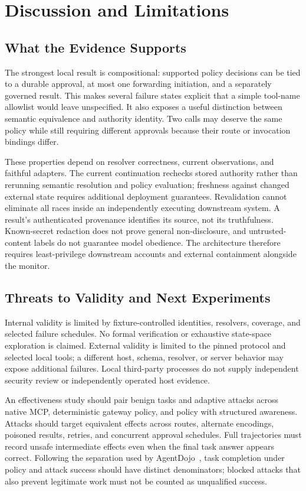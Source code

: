 \documentclass[conference,letterpaper]{IEEEtran}
\begin{document}
\section{Discussion and Limitations}
\subsection{What the Evidence Supports}
The strongest local result is compositional: supported policy decisions can be tied to a durable approval, at most one forwarding initiation, and a separately governed result. This makes several failure states explicit that a simple tool-name allowlist would leave unspecified. It also exposes a useful distinction between semantic equivalence and authority identity. Two calls may deserve the same policy while still requiring different approvals because their route or invocation bindings differ.

These properties depend on resolver correctness, current observations, and faithful adapters. The current continuation rechecks stored authority rather than rerunning semantic resolution and policy evaluation; freshness against changed external state requires additional deployment guarantees. Revalidation cannot eliminate all races inside an independently executing downstream system. A result's authenticated provenance identifies its source, not its truthfulness. Known-secret redaction does not prove general non-disclosure, and untrusted-content labels do not guarantee model obedience. The architecture therefore requires least-privilege downstream accounts and external containment alongside the monitor.

\subsection{Threats to Validity and Next Experiments}
Internal validity is limited by fixture-controlled identities, resolvers, coverage, and selected failure schedules. No formal verification or exhaustive state-space exploration is claimed. External validity is limited to the pinned protocol and selected local tools; a different host, schema, resolver, or server behavior may expose additional failures. Local third-party processes do not supply independent security review or independently operated host evidence.

An effectiveness study should pair benign tasks and adaptive attacks across native MCP, deterministic gateway policy, and policy with structured awareness. Attacks should target equivalent effects across routes, alternate encodings, poisoned results, retries, and concurrent approval schedules. Full trajectories must record unsafe intermediate effects even when the final task answer appears correct. Following the separation used by AgentDojo~\cite{agentdojo2024}, task completion under policy and attack success should have distinct denominators; blocked attacks that also prevent legitimate work must not be counted as unqualified success.
\end{document}
